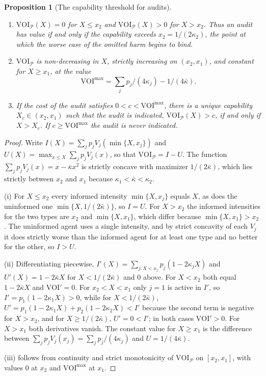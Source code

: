 \documentclass[11pt]{article}
\newcommand{\VOI}{\mathrm{VOI}}
\theoremstyle{plain}
\newtheorem{proposition}{Proposition}
\theoremstyle{definition}
\begin{document}
\begin{proposition}[The capability threshold for audits]\label{prop:capability}
\begin{enumerate}[label=(\roman*),nosep]
\item $\VOI_{\mathcal P}(X)=0$ for $X\le x_2$ and $\VOI_{\mathcal P}(X)>0$ for $X>x_2$. Thus an audit has value if and only if the capability exceeds $x_2=1/(2\kappa_2)$, the point at which the worse case of the omitted harm begins to bind.
\item $\VOI_{\mathcal P}$ is non-decreasing in $X$, strictly increasing on $(x_2,x_1)$, and constant for $X\ge x_1$, at the value
\[
\VOI^{\max}=\sum_jp_j/(4\kappa_j)-1/(4\bar\kappa).
\]
\item If the cost of the audit satisfies $0<c<\VOI^{\max}$, there is a unique capability $X_c\in(x_2,x_1)$ such that the audit is indicated, $\VOI_{\mathcal P}(X)>c$, if and only if $X>X_c$. If $c\ge\VOI^{\max}$ the audit is never indicated.
\end{enumerate}
\end{proposition}

\begin{proof}
Write $I(X)=\sum_jp_jV_j(\min\{X,x_j\})$ and $U(X)=\max_{x\le X}\sum_jp_jV_j(x)$, so that $\VOI_{\mathcal P}=I-U$. The function $\sum_jp_jV_j(x)=x-\bar\kappa x^2$ is strictly concave with maximizer $1/(2\bar\kappa)$, which lies strictly between $x_2$ and $x_1$ because $\kappa_1<\bar\kappa<\kappa_2$.

(i) For $X\le x_2$ every informed intensity $\min\{X,x_j\}$ equals $X$, as does the uninformed one $\min\{X,1/(2\bar\kappa)\}$, so $I=U$. For $X>x_2$ the informed intensities for the two types are $x_2$ and $\min\{X,x_1\}$, which differ because $\min\{X,x_1\}>x_2$. The uninformed agent uses a single intensity, and by strict concavity of each $V_j$ it does strictly worse than the informed agent for at least one type and no better for the other, so $I>U$.

(ii) Differentiating piecewise, $I'(X)=\sum_{j:X<x_j}p_j(1-2\kappa_jX)$ and $U'(X)=1-2\bar\kappa X$ for $X<1/(2\bar\kappa)$ and $0$ above. For $X<x_2$ both equal $1-2\bar\kappa X$ and $\VOI'=0$. For $x_2<X<x_1$ only $j=1$ is active in $I'$, so $I'=p_1(1-2\kappa_1X)>0$, while for $X<1/(2\bar\kappa)$, $U'=p_1(1-2\kappa_1X)+p_2(1-2\kappa_2X)<I'$ because the second term is negative for $X>x_2$, and for $X\ge1/(2\bar\kappa)$, $U'=0<I'$; in both cases $\VOI'>0$. For $X>x_1$ both derivatives vanish. The constant value for $X\ge x_1$ is the difference between $\sum_jp_jV_j(x_j)=\sum_jp_j/(4\kappa_j)$ and $U=1/(4\bar\kappa)$.

(iii) follows from continuity and strict monotonicity of $\VOI_{\mathcal P}$ on $[x_2,x_1]$, with values $0$ at $x_2$ and $\VOI^{\max}$ at $x_1$.
\end{proof}
\end{document}
